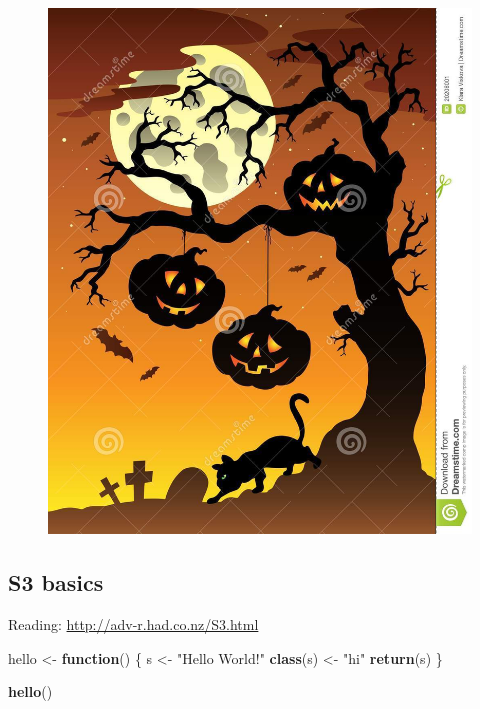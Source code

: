 \documentclass[]{book}
\newenvironment{Shaded}{\begin{snugshade}}{\end{snugshade}}
\newcommand{\KeywordTok}[1]{\textcolor[rgb]{0.13,0.29,0.53}{\textbf{#1}}}
\newcommand{\StringTok}[1]{\textcolor[rgb]{0.31,0.60,0.02}{#1}}
\newcommand{\ControlFlowTok}[1]{\textcolor[rgb]{0.13,0.29,0.53}{\textbf{#1}}}
\newcommand{\NormalTok}[1]{#1}
\theoremstyle{definition}
\theoremstyle{definition}
\theoremstyle{definition}
\theoremstyle{remark}
\begin{document}
\begin{figure}

{\centering \includegraphics[width=14.56in]{images/ch3_halloween_tree} 

}

\end{figure}

\subsection{S3 basics}\label{s3-basics}

Reading: \url{http://adv-r.had.co.nz/S3.html}

\begin{Shaded}
\begin{Highlighting}[]
\NormalTok{hello <-}\StringTok{ }\ControlFlowTok{function}\NormalTok{() \{}
\NormalTok{ s <-}\StringTok{ "Hello World!"}
 \KeywordTok{class}\NormalTok{(s) <-}\StringTok{ "hi"}
 \KeywordTok{return}\NormalTok{(s)}
\NormalTok{\}}

\KeywordTok{hello}\NormalTok{()}
\end{Highlighting}
\end{Shaded}
\end{document}
